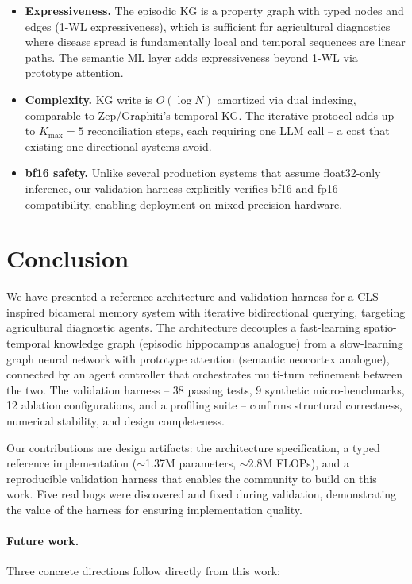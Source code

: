 \documentclass{article}
\begin{document}
\begin{itemize}
  \item \textbf{Expressiveness.} The episodic KG is a property graph with typed
        nodes and edges (1-WL expressiveness), which is sufficient for agricultural
        diagnostics where disease spread is fundamentally local and temporal
        sequences are linear paths. The semantic ML layer adds expressiveness
        beyond 1-WL via prototype attention.
  \item \textbf{Complexity.} KG write is $O(\log N)$ amortized via dual indexing,
        comparable to Zep/Graphiti's temporal KG. The iterative protocol adds up
        to $K_{\max} = 5$ reconciliation steps, each requiring one LLM call --
        a cost that existing one-directional systems avoid.
  \item \textbf{bf16 safety.} Unlike several production systems that assume
        float32-only inference, our validation harness explicitly verifies bf16
        and fp16 compatibility, enabling deployment on mixed-precision hardware.
\end{itemize}

\section{Conclusion}
\label{sec:conclusion}

We have presented a reference architecture and validation harness for a
CLS-inspired bicameral memory system with iterative bidirectional querying,
targeting agricultural diagnostic agents. The architecture decouples a
fast-learning spatio-temporal knowledge graph (episodic hippocampus analogue) from
a slow-learning graph neural network with prototype attention (semantic neocortex
analogue), connected by an agent controller that orchestrates multi-turn refinement
between the two. The validation harness -- 38 passing tests, 9 synthetic
micro-benchmarks, 12 ablation configurations, and a profiling suite -- confirms
structural correctness, numerical stability, and design completeness.

Our contributions are design artifacts: the architecture specification, a typed
reference implementation ($\sim$1.37M parameters, $\sim$2.8M FLOPs), and a
reproducible validation harness that enables the community to build on this work.
Five real bugs were discovered and fixed during validation, demonstrating the
value of the harness for ensuring implementation quality.

\paragraph{Future work.}
Three concrete directions follow directly from this work:
\end{document}
